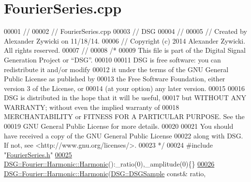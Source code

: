 \hypertarget{_fourier_series_8cpp_source}{\section{Fourier\+Series.\+cpp}
\label{_fourier_series_8cpp_source}
}

\begin{DoxyCode}
00001 \textcolor{comment}{//}
00002 \textcolor{comment}{//  FourierSeries.cpp}
00003 \textcolor{comment}{//  DSG}
00004 \textcolor{comment}{//}
00005 \textcolor{comment}{//  Created by Alexander Zywicki on 11/18/14.}
00006 \textcolor{comment}{//  Copyright (c) 2014 Alexander Zywicki. All rights reserved.}
00007 \textcolor{comment}{//}
00008 \textcolor{comment}{/*}
00009 \textcolor{comment}{ This file is part of the Digital Signal Generation Project or “DSG”.}
00010 \textcolor{comment}{}
00011 \textcolor{comment}{ DSG is free software: you can redistribute it and/or modify}
00012 \textcolor{comment}{ it under the terms of the GNU General Public License as published by}
00013 \textcolor{comment}{ the Free Software Foundation, either version 3 of the License, or}
00014 \textcolor{comment}{ (at your option) any later version.}
00015 \textcolor{comment}{}
00016 \textcolor{comment}{ DSG is distributed in the hope that it will be useful,}
00017 \textcolor{comment}{ but WITHOUT ANY WARRANTY; without even the implied warranty of}
00018 \textcolor{comment}{ MERCHANTABILITY or FITNESS FOR A PARTICULAR PURPOSE.  See the}
00019 \textcolor{comment}{ GNU General Public License for more details.}
00020 \textcolor{comment}{}
00021 \textcolor{comment}{ You should have received a copy of the GNU General Public License}
00022 \textcolor{comment}{ along with DSG.  If not, see <http://www.gnu.org/licenses/>.}
00023 \textcolor{comment}{ */}
00024 \textcolor{preprocessor}{#include "\hyperlink{_fourier_series_8h}{FourierSeries.h}"}
\hypertarget{_fourier_series_8cpp_source_l00025}{}\hyperlink{class_d_s_g_1_1_fourier_1_1_harmonic_a5433617eaac39402d27ce24634140940}{00025} \hyperlink{class_d_s_g_1_1_fourier_1_1_harmonic_a5433617eaac39402d27ce24634140940}{DSG::Fourier::Harmonic::Harmonic}():\_ratio(0),\_amplitude(0)\{\}
\hypertarget{_fourier_series_8cpp_source_l00026}{}\hyperlink{class_d_s_g_1_1_fourier_1_1_harmonic_a1dbca63f18e7271f78ad466bacdad394}{00026} \hyperlink{class_d_s_g_1_1_fourier_1_1_harmonic_a5433617eaac39402d27ce24634140940}{DSG::Fourier::Harmonic::Harmonic}(\hyperlink{namespace_d_s_g_ac39a94cd27ebcd9c1e7502d0c624894a}{DSG::DSGSample} \textcolor{keyword}{const}& ratio,

\end{DoxyCode}

